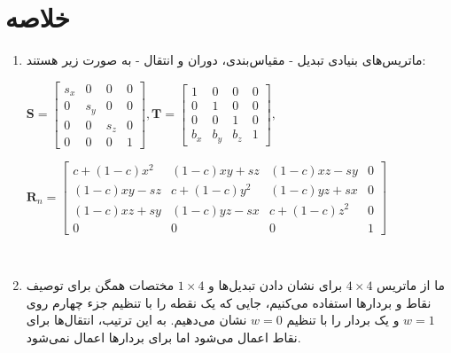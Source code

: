 \section{\textbf{خلاصه}}
\label{sec:3.7}
{
    \Large
    \begin{spacing}{1.5}
        \begin{enumerate}[label=\textbf{\arabic*}.]
            \item {ماتریس‌های بنیادی تبدیل - مقیاس‌بندی، دوران و انتقال - به صورت زیر هستند:
                \begin{center}
                    $\textbf{S}=\begin{bmatrix}
                                    s_x & 0   & 0   & 0 \\
                                    0   & s_y & 0   & 0 \\
                                    0   & 0   & s_z & 0 \\
                                    0   & 0   & 0   & 1
                    \end{bmatrix},\textbf{T}=\begin{bmatrix}
                                                 1     & 0     & 0     & 0 \\
                                                 0     & 1     & 0     & 0 \\
                                                 0     & 0     & 1     & 0 \\
                                                 b_{x} & b_{y} & b_{z} & 1
                    \end{bmatrix},$
                \end{center}

                $\textbf{R}_{n}=\begin{bmatrix}
                                    c+(1-c)x^{2} & (1-c)xy+sz   & (1-c)xz-sy   & 0 \\
                                    (1-c)xy-sz   & c+(1-c)y^{2} & (1-c)yz+sx   & 0 \\
                                    (1-c)xz+sy   & (1-c)yz-sx   & c+(1-c)z^{2} & 0 \\
                                    0            & 0            & 0            & 1
                \end{bmatrix}$
            }  \\\textbf{\vspace{6pt}}

            \item {ما از ماتریس $4\times 4$ برای نشان دادن تبدیل‌ها و $1\times 4$ مختصات همگن برای توصیف نقاط و بردارها استفاده می‌کنیم،
            جایی که یک نقطه را با تنظیم جزء چهارم روی $w=1$ و یک بردار را با تنظیم $w=0$ نشان می‌دهیم.
            به این ترتیب، انتقال‌ها برای نقاط اعمال می‌شود اما برای بردارها اعمال نمی‌شود.}  \\\textbf{\vspace{6pt}}


\end{enumerate}
\end{spacing}}
